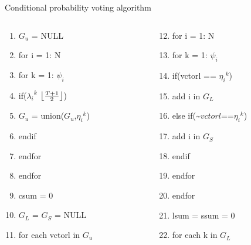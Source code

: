 \documentclass{beamer}
\DeclarePairedDelimiter\floor{\lfloor}{\rfloor}
\begin{document}
\begin{frame}{Conditional probability voting algorithm}
    \begin{block}{}
        \begin{columns}[T] 
            \begin{column}{.34\textwidth}
                \begin{enumerate}
                    \item $G_u$ = NULL
                    \item for i = 1: N
                    \item for k = 1: $\psi_i$
                    \item if(${\lambda_i}^k$ \geq\: $\floor*{\frac{T+1}{2}}$)
                    \item $G_u$ = union($G_u$,${\eta_i}^k$)
                    \item endif
                    \item endfor
                    \item endfor
                    \item csum = 0
                    \item $G_L$ = $G_S$ = NULL
                    \item for each vctorl in $G_u$
                \end{enumerate}
            \end{column}
            \begin{column}{.36\textwidth}
                \begin{enumerate}
                    \setcounter{enumi}{11}
                    \item for i = 1: N
                    \item for k = 1: $\psi_i$
                    \item if(vctorl == ${\eta_i}^k$)
                    \item add i in $G_L$
                    \item else if(\sim$vctorl$==${\eta_i}^k$)
                    \item add i in $G_S$
                    \item endif
                    \item endfor
                    \item endfor
                    \item lsum = ssum = 0
                    \item for each k in $G_L$
                \end{enumerate}

\end{column}
\end{columns}
\end{block}
\end{frame}
\end{document}
